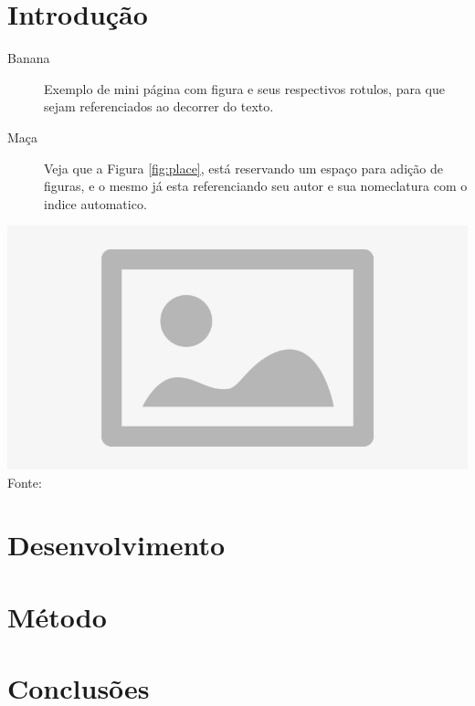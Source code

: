
\section{Introdução}




\noindent \begin{minipage}[c]{0.6\textwidth}
  \vspace {1cm}
  \begin{description}
    \item [Banana] Exemplo de mini página com figura e seus respectivos rotulos, para que sejam referenciados ao decorrer do texto.
    \item [Maça] Veja que a Figura \ref{fig:place}, está reservando um espaço para adição de figuras, e o mesmo já esta referenciando seu autor e sua nomeclatura com o indice automatico.
  \end{description}

\end{minipage}
\begin{minipage}[c]{0.4\textwidth}
  \includegraphics[width=\textwidth]{figure/placeholder.jpg}
  	\label{fig:place}
    {\fontsize{10pt}{\baselineskip}\selectfont
    Fonte: 
  }

\end{minipage}


\section{Desenvolvimento}




\section{Método}





\section{Conclusões}



